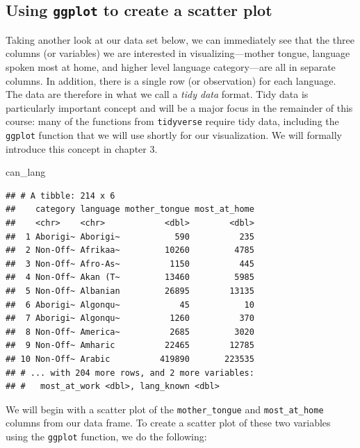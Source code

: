 \documentclass[
]{krantz}
\makeatletter
\newenvironment{Shaded}{\begin{snugshade}}{\end{snugshade}}
\newcommand{\NormalTok}[1]{#1}
\newenvironment{kframe}{%
\medskip{}
\setlength{\fboxsep}{.8em}
 \def\at@end@of@kframe{}%
 \ifinner\ifhmode%
  \def\at@end@of@kframe{\end{minipage}}%
  \begin{minipage}{\columnwidth}%
 \fi\fi%
 \def\FrameCommand##1{\hskip\@totalleftmargin \hskip-\fboxsep
 \colorbox{shadecolor}{##1}\hskip-\fboxsep
     \hskip-\linewidth \hskip-\@totalleftmargin \hskip\columnwidth}%
 \MakeFramed {\advance\hsize-\width
   \@totalleftmargin\z@ \linewidth\hsize
   \@setminipage}}%
 {\par\unskip\endMakeFramed%
 \at@end@of@kframe}
\renewenvironment{Shaded}{\begin{kframe}}{\end{kframe}}
\makeatother
\begin{document}
\hypertarget{using-ggplot-to-create-a-scatter-plot}{%
\subsection{\texorpdfstring{Using \texttt{ggplot} to create a scatter plot}{Using ggplot to create a scatter plot}}\label{using-ggplot-to-create-a-scatter-plot}}

Taking another look at our data set below, we can immediately see that the three columns (or variables) we are interested in visualizing---mother tongue, language spoken most at home, and higher level language category---are all in separate columns. In addition, there is a single row (or observation) for each language.
The data are therefore in what we call a \emph{tidy data} format.
Tidy data is particularly important concept and will be a major focus in the remainder of this course: many of the functions from \texttt{tidyverse} require tidy data,
including the \texttt{ggplot} function that we will use shortly for our visualization. We will formally introduce this concept in chapter 3.

\begin{Shaded}
\begin{Highlighting}[]
\NormalTok{can\_lang}
\end{Highlighting}
\end{Shaded}

\begin{verbatim}
## # A tibble: 214 x 6
##    category language mother_tongue most_at_home
##    <chr>    <chr>            <dbl>        <dbl>
##  1 Aborigi~ Aborigi~           590          235
##  2 Non-Off~ Afrikaa~         10260         4785
##  3 Non-Off~ Afro-As~          1150          445
##  4 Non-Off~ Akan (T~         13460         5985
##  5 Non-Off~ Albanian         26895        13135
##  6 Aborigi~ Algonqu~            45           10
##  7 Aborigi~ Algonqu~          1260          370
##  8 Non-Off~ America~          2685         3020
##  9 Non-Off~ Amharic          22465        12785
## 10 Non-Off~ Arabic          419890       223535
## # ... with 204 more rows, and 2 more variables:
## #   most_at_work <dbl>, lang_known <dbl>
\end{verbatim}

We will begin with a scatter plot of the \texttt{mother\_tongue} and \texttt{most\_at\_home} columns from our data frame.
To create a scatter plot of these two variables using the \texttt{ggplot} function, we do the following:
\end{document}
